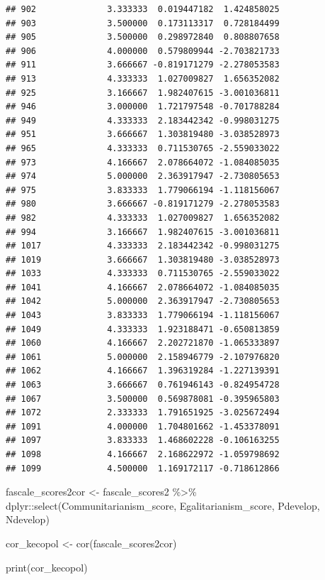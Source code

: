 \documentclass[
]{article}
\newenvironment{Shaded}{\begin{snugshade}}{\end{snugshade}}
\newcommand{\FunctionTok}[1]{\textcolor[rgb]{0.00,0.00,0.00}{#1}}
\newcommand{\NormalTok}[1]{#1}
\newcommand{\OtherTok}[1]{\textcolor[rgb]{0.56,0.35,0.01}{#1}}
\newcommand{\SpecialCharTok}[1]{\textcolor[rgb]{0.00,0.00,0.00}{#1}}
\begin{document}
\begin{verbatim}
## 902              3.333333  0.019447182  1.424858025
## 903              3.500000  0.173113317  0.728184499
## 905              3.500000  0.298972840  0.808807658
## 906              4.000000  0.579809944 -2.703821733
## 911              3.666667 -0.819171279 -2.278053583
## 913              4.333333  1.027009827  1.656352082
## 925              3.166667  1.982407615 -3.001036811
## 946              3.000000  1.721797548 -0.701788284
## 949              4.333333  2.183442342 -0.998031275
## 951              3.666667  1.303819480 -3.038528973
## 965              4.333333  0.711530765 -2.559033022
## 973              4.166667  2.078664072 -1.084085035
## 974              5.000000  2.363917947 -2.730805653
## 975              3.833333  1.779066194 -1.118156067
## 980              3.666667 -0.819171279 -2.278053583
## 982              4.333333  1.027009827  1.656352082
## 994              3.166667  1.982407615 -3.001036811
## 1017             4.333333  2.183442342 -0.998031275
## 1019             3.666667  1.303819480 -3.038528973
## 1033             4.333333  0.711530765 -2.559033022
## 1041             4.166667  2.078664072 -1.084085035
## 1042             5.000000  2.363917947 -2.730805653
## 1043             3.833333  1.779066194 -1.118156067
## 1049             4.333333  1.923188471 -0.650813859
## 1060             4.166667  2.202721870 -1.065333897
## 1061             5.000000  2.158946779 -2.107976820
## 1062             4.166667  1.396319284 -1.227139391
## 1063             3.666667  0.761946143 -0.824954728
## 1067             3.500000  0.569878081 -0.395965803
## 1072             2.333333  1.791651925 -3.025672494
## 1091             4.000000  1.704801662 -1.453378091
## 1097             3.833333  1.468602228 -0.106163255
## 1098             4.166667  2.168622972 -1.059798692
## 1099             4.500000  1.169172117 -0.718612866
\end{verbatim}

\begin{Shaded}
\begin{Highlighting}[]
\NormalTok{fascale\_scores2cor }\OtherTok{\textless{}{-}}\NormalTok{ fascale\_scores2 }\SpecialCharTok{\%\textgreater{}\%}
\NormalTok{  dplyr}\SpecialCharTok{::}\FunctionTok{select}\NormalTok{(Communitarianism\_score, Egalitarianism\_score, Pdevelop, Ndevelop)}

\NormalTok{cor\_kecopol }\OtherTok{\textless{}{-}} \FunctionTok{cor}\NormalTok{(fascale\_scores2cor)}

\FunctionTok{print}\NormalTok{(cor\_kecopol)}
\end{Highlighting}
\end{Shaded}
\end{document}
